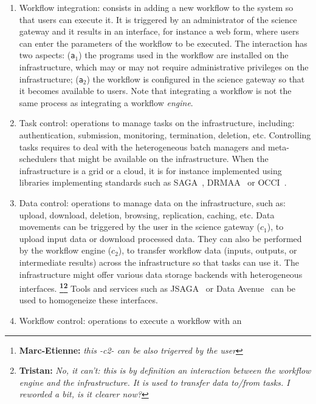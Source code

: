 \documentclass[preprint,3p,twocolumn]{elsarticle}
\newcommand{\note}[2]{\textbf{\Large{\color{blue}\footnote{{\color{blue}\textbf{#1:} \textit{#2}\color{black}}}}}}
\begin{document}
\begin{enumerate}[leftmargin=0cm,itemindent=0.6cm,label=\texttt{(\alph*)}]

\item Workflow integration: consists in adding a new workflow to the
  system so that users can execute it. It is triggered by an
  administrator of the science gateway and it results in an interface,
  for instance a web form, where users can enter the parameters of the
  workflow to be executed. The interaction has two aspects:
  (\texttt{a$_1$}) the programs used in the workflow are installed on
  the infrastructure, which may or may not require administrative
  privileges on the infrastructure; (\texttt{a$_2$}) the workflow is
  configured in the science gateway so that it becomes available to
  users. Note that integrating a workflow is not the same process as
  integrating a workflow \emph{engine}.
\item Task control: operations to manage tasks on the infrastructure,
  including: authentication, submission, monitoring, termination,
  deletion, etc. Controlling tasks requires to deal with the
  heterogeneous batch managers and meta-schedulers that might be
  available on the infrastructure. When the infrastructure is a grid
  or a cloud, it is for instance implemented using libraries
  implementing standards such as SAGA~\cite{goodale2006saga},
  DRMAA~\cite{troger2012distributed} or OCCI~\cite{edmonds2012toward}.
\item Data control: operations to manage data on the infrastructure,
  such as: upload, download, deletion, browsing, replication, caching,
  etc. Data movements can be triggered by the user in the science
  gateway (\texttt{$c_1$}), to upload input data or download processed
  data. They can also be performed by the workflow engine
  (\texttt{$c_2$}), to transfer workflow data (inputs, outputs, or
  intermediate results) across the infrastructure so that tasks can
  use it. The infrastructure might offer various data storage backends
  with heterogeneous interfaces. \note{Marc-Etienne}{this -c2- can be also trigerred
    by the user}\note{Tristan}{No, it can't: this is by definition an interaction between the workflow engine and the infrastructure. It is used to transfer data to/from tasks. I reworded a bit, is it clearer now?} Tools and services such as
  JSAGA~\cite{reynaud2010uniform} or Data Avenue~\cite{hajnal2014data}
  can be used to homogeneize these interfaces.
\item Workflow control: operations to execute a workflow with an

\end{enumerate}
\end{document}
